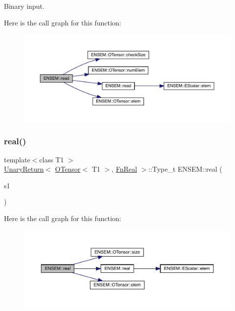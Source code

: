 Binary input. 

Here is the call graph for this function\+:\nopagebreak
\begin{figure}[H]
\begin{center}
\leavevmode
\includegraphics[width=350pt]{de/d87/group__obstensor_ga99e7dbdd85834a965f5483165945d05a_cgraph}
\end{center}
\end{figure}
\mbox{\label{group__obstensor_ga6d95b4347a14db99d06a34a4aa52038b}} 
\subsubsection{\texorpdfstring{real()}{real()}}
{\footnotesize\ttfamily template$<$class T1 $>$ \\
\mbox{\hyperlink{structENSEM_1_1UnaryReturn}{Unary\+Return}}$<$ \mbox{\hyperlink{classENSEM_1_1OTensor}{O\+Tensor}}$<$ T1 $>$, \mbox{\hyperlink{structENSEM_1_1FnReal}{Fn\+Real}} $>$\+::Type\+\_\+t E\+N\+S\+E\+M\+::real (\begin{DoxyParamCaption}\item[{const \mbox{\hyperlink{classENSEM_1_1OTensor}{O\+Tensor}}$<$ T1 $>$ \&}]{s1 }\end{DoxyParamCaption})\hspace{0.3cm}{\ttfamily [inline]}}

Here is the call graph for this function\+:\nopagebreak
\begin{figure}[H]
\begin{center}
\leavevmode
\includegraphics[width=350pt]{de/d87/group__obstensor_ga6d95b4347a14db99d06a34a4aa52038b_cgraph}
\end{center}
\end{figure}
\mbox{\label{group__obstensor_gaa4e4751f0d9a575eaac0fb52f7bb0c73}} 
